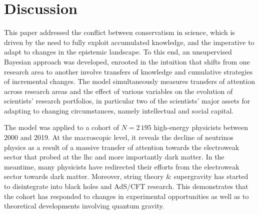 \documentclass{article}
\begin{document}
\section{Discussion}

This paper addressed the conflict between conservatism in science, which is driven by the need to fully exploit accumulated knowledge, and the imperative to adapt to changes in the epistemic landscape. To this end, an unsupervised Bayesian approach was developed, enrooted in the intuition that shifts from one research area to another involve transfers of knowledge and cumulative strategies of incremental changes. The model simultaneously measures transfers of attention across research areas and the effect of various variables on the evolution of scientists' research portfolios, in particular two of the scientists' major assets for adapting to changing circumstances, namely intellectual and social capital.






The model was applied to a cohort of $N=2\,195$ high-energy physicists between 2000 and 2019. At the macroscopic level, it reveals the decline of neutrinos physics as a result of a massive transfer of attention towards the electroweak sector that probed at the \gls{lhc} and more importantly dark matter. In the meantime, many physicists have redirected their efforts from the electroweak sector towards dark matter. Moreover, string theory \& supergravity has started to disintegrate into black holes and AdS/CFT research. This demonstrates that the cohort has responded to changes in experimental opportunities as well as to theoretical developments involving quantum gravity.
\end{document}
